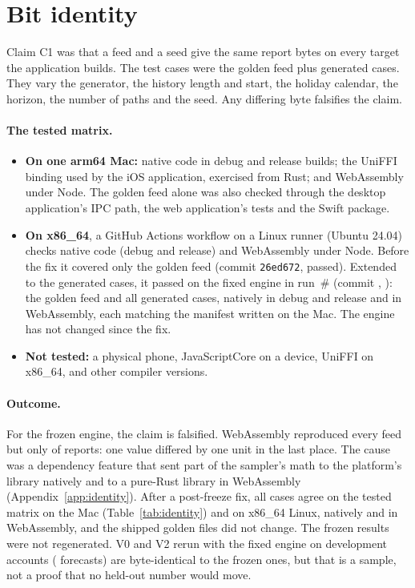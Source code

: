\section{Bit identity}
\label{sec:identity}

Claim C1 was that a feed and a seed give the same report bytes on every
target the application builds. The test cases were the golden feed plus
 generated cases. They vary the
generator, the history length and start, the holiday calendar, the
horizon, the number of paths and the seed. Any differing byte falsifies
the claim.

\paragraph{The tested matrix.}
\begin{itemize}
\item \textbf{On one arm64 Mac:} native code in debug and release builds;
  the UniFFI binding used by the iOS application, exercised from Rust; and
  WebAssembly under Node. The golden feed alone was also checked through
  the desktop application's IPC path, the web application's tests and the
  Swift package.
\item \textbf{On x86\_64}, a GitHub Actions workflow on a Linux runner
  (Ubuntu 24.04) checks native code (debug and release) and WebAssembly
  under Node. Before the fix it covered only the golden feed (commit
  \texttt{26ed672}, passed). Extended to the generated cases, it passed on
  the fixed engine in run~\# (commit
  \texttt{}, ): the golden feed and all
   generated cases, natively in debug
  and release and in WebAssembly, each matching the manifest written on
  the Mac. The engine has not changed since the fix.
\item \textbf{Not tested:} a physical phone, JavaScriptCore on a device,
  UniFFI on x86\_64, and other compiler versions.
\end{itemize}

\paragraph{Outcome.} For the frozen engine, the claim is falsified.
WebAssembly reproduced every feed but only
 of
 reports: one value differed by one
unit in the last place. The cause was a dependency feature that sent part
of the sampler's math to the platform's library natively and to a
pure-Rust library in WebAssembly (Appendix~\ref{app:identity}). After a
post-freeze fix, all  cases agree on
the tested matrix on the Mac (Table~\ref{tab:identity}) and on x86\_64
Linux, natively and in WebAssembly, and the shipped
golden files did not change. The frozen results were not regenerated. V0
and V2 rerun with the fixed engine on  development
accounts ( forecasts) are byte-identical to the frozen
ones, but that is a sample, not a proof that no held-out number would
move.

